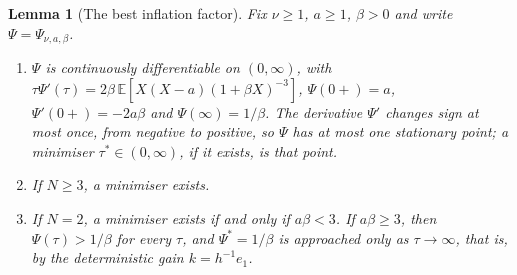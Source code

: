 \documentclass[11pt,a4paper]{article}
\numberwithin{equation}{section}
\newtheorem{lemma}[theorem]{Lemma}
\theoremstyle{remark}\newtheorem{remark}[theorem]{Remark}
\newcommand{\E}{\mathbb E}
\begin{document}
\begin{lemma}[The best inflation factor]\label{lem:taustar}
Fix \(\nu\ge1\), \(a\ge1\), \(\beta>0\) and write \(\Psi=\Psi_{\nu,a,\beta}\).
\begin{enumerate}
\item \(\Psi\) is continuously differentiable on \((0,\infty)\), with
 \(\tau\Psi'(\tau)=2\beta\,\E[X(X-a)(1+\beta X)^{-3}]\), \(\Psi(0+)=a\),
 \(\Psi'(0+)=-2a\beta\) and \(\Psi(\infty)=1/\beta\). The derivative \(\Psi'\) changes sign at most
 once, from negative to positive, so \(\Psi\) has at most one stationary point; a minimiser
 \(\tau^*\in(0,\infty)\), if it exists, is that point.
\item If \(N\ge3\), a minimiser exists.
\item If \(N=2\), a minimiser exists if and only if \(a\beta<3\). If \(a\beta\ge3\), then
 \(\Psi(\tau)>1/\beta\) for every \(\tau\), and \(\Psi^*=1/\beta\) is approached only as
 \(\tau\to\infty\), that is, by the deterministic gain \(k=h^{-1}e_1\).
\end{enumerate}
\end{lemma}
\end{document}
